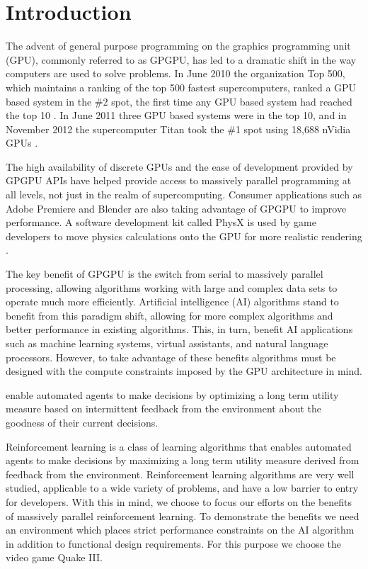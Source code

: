 \chapter{Introduction}
\label{chap:introduction}

The advent of general purpose programming on the graphics programming unit (GPU), commonly referred to as GPGPU, has led to a dramatic shift in the way computers are used to solve problems. In June 2010 the organization Top 500, which maintains a ranking of the top 500 fastest supercomputers, ranked a GPU based system in the \#2 spot, the first time any GPU based system had reached the top 10 \cite{top500:2010}. In June 2011 three GPU based systems were in the top 10, and in November 2012 the supercomputer Titan took the \#1 spot using 18,688 nVidia GPUs \cite{top500:2011,top500:2012}.

The high availability of discrete GPUs and the ease of development provided by GPGPU APIs have helped provide access to massively parallel programming at all levels, not just in the realm of supercomputing. Consumer applications such as Adobe Premiere \cite{adobe} and Blender \cite{blender} are also taking advantage of GPGPU to improve performance. A software development kit called PhysX is used by game developers to move physics calculations onto the GPU for more realistic rendering \cite{physx}.

The key benefit of GPGPU is the switch from serial to massively parallel processing, allowing algorithms working with large and complex data sets to operate much more efficiently. Artificial intelligence (AI) algorithms stand to benefit from this paradigm shift, allowing for more complex algorithms and better performance in existing algorithms. This, in turn, benefit AI applications such as machine learning systems, virtual assistants, and natural language processors. However, to take advantage of these benefits algorithms must be designed with the compute constraints imposed by the GPU architecture in mind.

enable automated agents to make decisions by optimizing a long term utility measure based on intermittent feedback from the environment about the goodness of their current decisions.

Reinforcement learning is a class of learning algorithms that enables automated agents to make decisions by maximizing a long term utility measure derived from feedback from the environment. Reinforcement learning algorithms are very well studied, applicable to a wide variety of problems, and have a low barrier to entry for developers. With this in mind, we choose to focus our efforts on the benefits of massively parallel reinforcement learning. To demonstrate the benefits we need an environment which places strict performance constraints on the AI algorithm in addition to functional design requirements. For this purpose we choose the video game Quake III.

